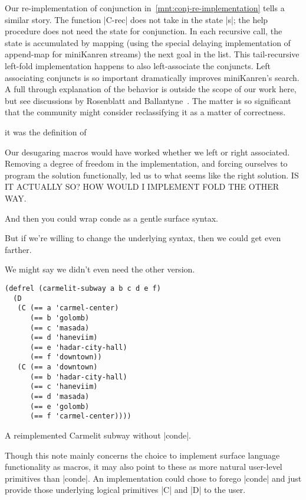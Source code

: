 \documentclass[sigplan,screen,draft,anonymous,review,natbib=false]{acmart}
\begin{document}
Our re-implementation of conjunction
in~\cref{mnt:conj-re-implementation} tells a similar story. The
function \rackinline|C-rec| does not take in the state \rackinline|s|;
the help procedure does not need the state for conjunction. In each
recursive call, the state is accumulated by mapping (using the special
delaying implementation of append-map for miniKanren streams) the next
goal in the list. This tail-recursive left-fold implementation happens
to also left-associate the conjuncts. Left associating conjuncts is so
important dramatically improves miniKanren's search. A full through
explanation of the behavior is outside the scope of our work here, but
see discussions by Rosenblatt and Ballantyne~\cite{here,nowhere}. The
matter is so significant that the community might consider
reclassifying it as a matter of correctness.


it was the definition of

Our desugaring macros would have worked whether we left or right
associated. Removing a degree of freedom in the implementation, and
forcing ourselves to program the solution functionally, led us to what
seems like the right solution. IS IT ACTUALLY SO? HOW WOULD I IMPLEMENT FOLD THE OTHER WAY.

And then you could wrap conde as a gentle surface syntax.

But if we’re willing to change the underlying syntax, then we could
get even farther.

We might say we didn’t even need the other version.


\begin{listing}
  \begin{verbatim}
(defrel (carmelit-subway a b c d e f)
  (D
   (C (== a 'carmel-center)
      (== b 'golomb)
      (== c 'masada)
      (== d 'haneviim)
      (== e 'hadar-city-hall)
      (== f 'downtown))
   (C (== a 'downtown)
      (== b 'hadar-city-hall)
      (== c 'haneviim)
      (== d 'masada)
      (== e 'golomb)
      (== f 'carmel-center))))
  \end{verbatim}
  \caption{A reimplemented Carmelit subway without \rackinline|conde|.}
  \label{mnt:new-carmelit}
\end{listing}

Though this note mainly concerns the choice to implement surface
language functionality as macros, it may also point to these as more
natural user-level primitives than \rackinline|conde|. An
implementation could chose to forego \rackinline|conde| and just
provide those underlying logical primitives \rackinline|C| and
\rackinline|D| to the user.
\end{document}
